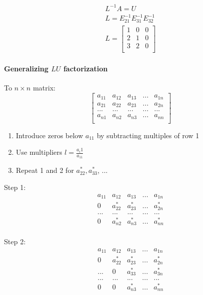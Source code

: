 \documentclass[12pt]{article}
\newcommand{\<}{\langle}
\renewcommand{\>}{\rangle}
\begin{document}
\[
	\begin{matrix}
		L^{-1}A = U \\
		L = E_{21}^{-1} E_{31}^{-1} E_{32}^{-1} \\
		L = \begin{bmatrix}
			1 & 0 & 0 \\
			2 & 1 & 0 \\
			3 & 2 & 0 \\
		\end{bmatrix}
	\end{matrix}
\]

\paragraph{Generalizing $LU$ factorization} To $n \times n$ matrix:
\[
	\begin{bmatrix}
		a_{11} & a_{12} & a_{13} & ... &  a_{1n} \\
		a_{21} & a_{22} & a_{23} & ... &  a_{2n} \\
		... & ... & ... & ... & ...  \\
		a_{n1} & a_{n2} & a_{n3} & ... &  a_{nn} \\
	\end{bmatrix}
\]

\begin{enumerate}
	\item Introduce zeros below $a_{11}$ by subtracting multiples of row 1
	\item Use multipliers $l = \frac{a_i1}{a_11}$
	\item Repeat 1 and 2 for $a_{22}^*,a_{33}^*$, ...
\end{enumerate}

Step 1:
\[
	\begin{array}{c|cccc}
		a_{11} & a_{12} & a_{13} & ... &  a_{1n} \\\hline
		0 & a_{22}^* & a_{23}^* & ... &  a_{2n}^* \\
		... & ... & ... & ... & ...  \\
		0 & a_{n2}^* & a_{n3}^* & ... &  a_{nn}^* \\
	\end{array}
\]

Step 2:
\[
	\begin{array}{c|c|ccc}
		a_{11} & a_{12} & a_{13} & ... &  a_{1n} \\\hline
		0 & a_{22}^* & a_{23}^* & ... &  a_{2n}^* \\\hline
		... & 0 & a_{33}^* & ... & a_{3n}^* \\
		... & ... & ... & ... & ...  \\
		0 & 0 & a_{n3}^* & ... &  a_{nn}^* \\
	\end{array}
\]
\end{document}
